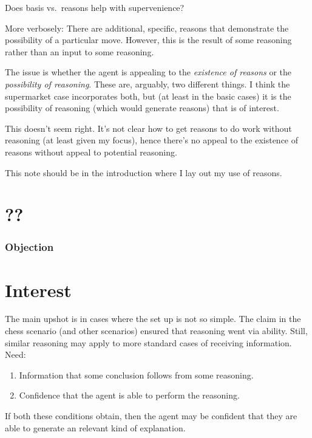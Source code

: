 \documentclass[10pt]{article}
\newcommand{\hozlinedash}[0]{%
  \noindent\hdashrule[0.5ex][c]{\textwidth}{.1pt}{2.5pt}
}
\begin{document}
\newpage
\begin{note}
  Does basis vs.\ reasons help with supervenience?

  More verbosely:
  There are additional, specific, reasons that demonstrate the possibility of a particular move.
  However, this is the result of some reasoning rather than an input to some reasoning.

  The issue is whether the agent is appealing to the \emph{existence of reasons} or the \emph{possibility of reasoning}.
  These are, arguably, two different things.
  I think the supermarket case incorporates both, but (at least in the basic cases) it is the possibility of reasoning (which would generate reasons) that is of interest.

  {
    \color{red}
    This doesn't seem right.
    It's not clear how to get reasons to do work without reasoning (at least given my focus), hence there's no appeal to the existence of reasons without appeal to potential reasoning.

    {
      \color{blue}
      This note should be in the introduction where I lay out my use of reasons.
    }
  }
\end{note}


\hozlinedash


\newpage

\section{??}

\subsubsection{Objection}


\section{Interest}
\label{sec:interest}

The main upshot is in cases where the set up is not so simple.
The claim in the chess scenario (and other scenarios) ensured that reasoning went via ability.
Still, similar reasoning may apply to more standard cases of receiving information.
Need:
\begin{enumerate}
\item Information that some conclusion follows from some reasoning.
\item Confidence that the agent is able to perform the reasoning.
\end{enumerate}
If both these conditions obtain, then the agent may be confident that they are able to generate an {\color{red} relevant kind of} explanation.
\end{document}
